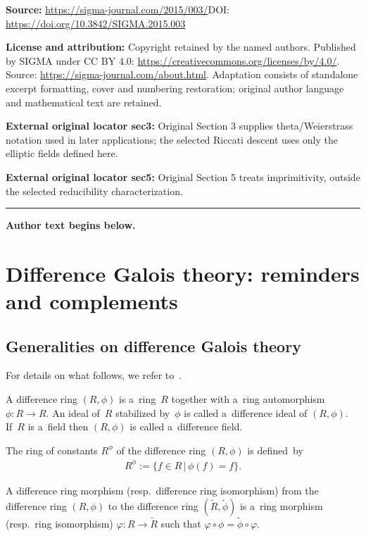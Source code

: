 \documentclass[11pt]{article}
\numberwithin{equation}{section}
\begin{document}
\noindent\textbf{Source:} \url{https://sigma-journal.com/2015/003/}\quad DOI: \url{https://doi.org/10.3842/SIGMA.2015.003}\par
\noindent\textbf{License and attribution:} Copyright retained by the named authors. Published by SIGMA under CC BY 4.0: \url{https://creativecommons.org/licenses/by/4.0/}. Source: \url{https://sigma-journal.com/about.html}. Adaptation consists of standalone excerpt formatting, cover and numbering restoration; original author language and mathematical text are retained.\par
\noindent\textbf{External original locator sec3:} Original Section 3 supplies theta/Weierstrass notation used in later applications; the selected Riccati descent uses only the elliptic fields defined here.\par
\noindent\textbf{External original locator sec5:} Original Section 5 treats imprimitivity, outside the selected reducibility characterization.\par
\medskip\hrule\medskip\noindent\textbf{Author text begins below.}\par
\setcounter{section}{1}
\setcounter{subsection}{0}
\setcounter{subsubsection}{0}
\setcounter{Theorem}{0}
\setcounter{equation}{4}
\section{Dif\/ference Galois theory: reminders and complements}
\label{sec2}

\subsection{Generalities on dif\/ference Galois theory}

For details on what follows, we refer to~\cite[Chapter~1]{VdPS97}.

A dif\/ference ring $(R,\phi)$ is a~ring~$R$ together with a~ring automorphism $\phi: R \rightarrow R$.
An ideal of~$R$ stabilized by~$\phi$ is called a~dif\/ference ideal of $(R,\phi)$.
If~$R$ is a~f\/ield then $(R,\phi)$ is called a~dif\/ference f\/ield.

The ring of constants $R^{\phi}$ of the dif\/ference ring $(R,\phi)$ is def\/ined~by
\begin{gather*}
R^{\phi}:=\{f \in R \, | \, \phi(f)=f\}.
\end{gather*}

A dif\/ference ring morphism (resp.\
dif\/ference ring isomorphism) from the dif\/ference ring $(R,\phi)$ to the dif\/ference ring
$(\widetilde{R},\widetilde{\phi})$ is a~ring morphism (resp.\
ring isomorphism) $\varphi: R \rightarrow \widetilde{R}$ such that $\varphi \circ \phi = \widetilde{\phi} \circ
\varphi$.
\end{document}
